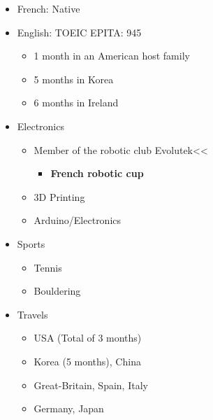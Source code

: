 \documentclass[a4paper,table]{twentysecondcv}
\begin{document}
{  \begin{itemize}[leftmargin=1mm]
    \setlength\itemsep{-5pt}
    \item French: Native
    \item English: TOEIC EPITA: 945
      \vspace{-5pt}
    \begin{itemize}
      \setlength\itemsep{-5pt}
      \item 1 month in an American host family
      \item 5 months in Korea
      \item 6 months in Ireland
    \end{itemize}
  \end{itemize}
  \begin{flushleft}
  \begin{itemize}[leftmargin=1mm]
    \setlength\itemsep{-5pt}
    \item Electronics
    \vspace{-5pt}
    \begin{itemize}
      \setlength\itemsep{-5pt}
      \item Member of the robotic club Evolutek<<
      \vspace{-5pt}
      \begin{itemize}
        \setlength\itemsep{-5pt}
        \item \textbf{French robotic cup}
      \end{itemize}
      \item 3D Printing
      \item Arduino/Electronics
    \end{itemize}
    \item Sports
    \vspace{-5pt}
    \begin{itemize}
      \setlength\itemsep{-5pt}
      \item Tennis
      \item Bouldering
    \end{itemize}
    \item Travels
    \vspace{-5pt}
    \begin{itemize}
      \setlength\itemsep{-5pt}
      \item USA (Total of 3 months)
      \item Korea (5 months), China
      \item Great-Britain, Spain, Italy
      \item Germany, Japan
    \end{itemize}
  \end{itemize}
  \end{flushleft}
}
\end{document}
